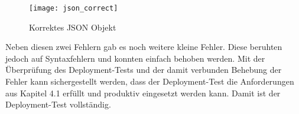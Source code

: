 \begin{figure}[H]
\vspace{-5pt}
\centering
\texttt{[image: json\_correct]}
\vspace{-25pt}
\caption{Korrektes JSON Objekt}
\vspace{-10pt}
\label{fig:json_correct}
\end{figure}
Neben diesen zwei Fehlern gab es noch weitere kleine Fehler. Diese beruhten jedoch auf Syntaxfehlern und konnten einfach behoben werden. Mit der Überprüfung des Deployment-Tests und der damit verbunden Behebung der Fehler kann sichergestellt werden, dass der Deployment-Test die Anforderungen aus Kapitel 4.1 erfüllt und produktiv eingesetzt werden kann. Damit ist der Deployment-Test vollständig.

